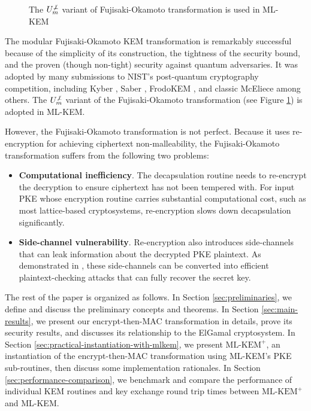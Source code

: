 \documentclass[journal=tches,submission]{iacrtrans}
\def\mlkemplus{\text{ML-KEM}^+}
\begin{document}
\begin{figure}[h]
    \caption{The $U^{\not\bot}_m$ variant of Fujisaki-Okamoto transformation is used in ML-KEM}\label{fig:u-notbot-m-routines}
\end{figure}

The modular Fujisaki-Okamoto KEM transformation is remarkably successful because of the simplicity of its construction, the tightness of the security bound, and the proven (though non-tight) security against quantum adversaries. It was adopted by many submissions to NIST's post-quantum cryptography competition, including Kyber \cite{DBLP:conf/eurosp/BosDKLLSSSS18}, Saber \cite{DBLP:conf/africacrypt/DAnversKRV18}, FrodoKEM \cite{DBLP:conf/ccs/BosCDMNNRS16}, and classic McEliece \cite{classicmceliecespec} among others. The $U^{\not\bot}_m$ variant of the Fujisaki-Okamoto transformation (see Figure \ref{fig:u-notbot-m-routines}) is adopted in ML-KEM.

However, the Fujisaki-Okamoto transformation is not perfect. Because it uses re-encryption for achieving ciphertext non-malleability, the Fujisaki-Okamoto transformation suffers from the following two problems: \begin{itemize}
    \item \textbf{Computational inefficiency}. The decapsulation routine needs to re-encrypt the decryption to ensure ciphertext has not been tempered with. For input PKE whose encryption routine carries substantial computational cost, such as most lattice-based cryptosystems, re-encryption slows down decapsulation significantly.
    \item \textbf{Side-channel vulnerability}. Re-encryption also introduces side-channels that can leak information about the decrypted PKE plaintext. As demonstrated in \cite{ueno2022curse}\cite{ravi2019generic}\cite{DBLP:journals/tches/TanakaUXITH23}, these side-channels can be converted into efficient plaintext-checking attacks that can fully recover the secret key.
\end{itemize}

The rest of the paper is organized as follows. In Section \ref{sec:preliminaries}, we define and discuss the preliminary concepts and theorems. In Section \ref{sec:main-results}, we present our encrypt-then-MAC transformation in details, prove its security results, and discusses its relationship to the ElGamal cryptosystem. In Section \ref{sec:practical-instantiation-with-mlkem}, we present $\mlkemplus$, an instantiation of the encrypt-then-MAC transformation using ML-KEM's PKE sub-routines, then discuss some implementation rationales. In Section \ref{sec:performance-comparison}, we benchmark and compare the performance of individual KEM routines and key exchange round trip times between $\mlkemplus$ and ML-KEM.
\end{document}
